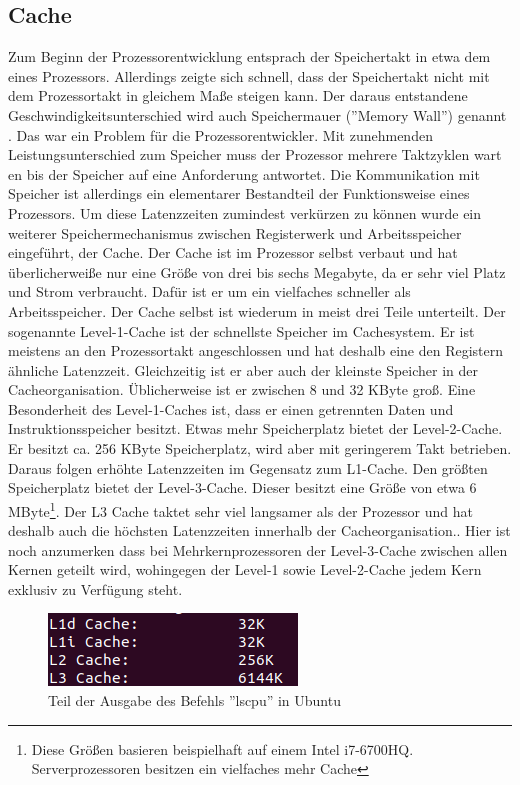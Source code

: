 \documentclass[12pt]{article}
\begin{document}
\subsection{Cache}
Zum Beginn der Prozessorentwicklung entsprach der Speichertakt in etwa dem eines Prozessors. Allerdings zeigte sich schnell, dass der Speichertakt nicht mit dem Prozessortakt in gleichem Maße steigen kann. Der daraus entstandene Geschwindigkeitsunterschied wird auch Speichermauer (''Memory Wall'') genannt \cite{mckee2004reflections}.
Das war ein Problem für die Prozessorentwickler. Mit zunehmenden Leistungsunterschied zum Speicher muss der Prozessor mehrere Taktzyklen wart%
en bis der Speicher auf eine Anforderung antwortet. Die Kommunikation mit Speicher ist allerdings ein elementarer Bestandteil der Funktionsweise eines Prozessors. Um diese Latenzzeiten zumindest verkürzen zu können wurde ein weiterer Speichermechanismus zwischen Registerwerk und Arbeitsspeicher eingeführt, der Cache. Der Cache ist im Prozessor selbst verbaut und hat überlicherweiße nur eine Größe von drei bis sechs Megabyte, da er sehr viel Platz und Strom verbraucht. Dafür ist er um ein vielfaches schneller als Arbeitsspeicher. Der Cache selbst ist wiederum in meist drei Teile unterteilt. Der sogenannte Level-1-Cache ist der schnellste Speicher im Cachesystem. Er ist meistens an den Prozessortakt angeschlossen und hat deshalb eine den Registern ähnliche Latenzzeit. Gleichzeitig ist er aber auch der kleinste Speicher in der Cacheorganisation. 
Üblicherweise ist er zwischen 8 und 32 KByte groß. Eine Besonderheit des Level-1-Caches ist, dass er  einen getrennten Daten und Instruktionsspeicher besitzt. Etwas mehr Speicherplatz bietet der Level-2-Cache. Er besitzt ca. 256 KByte Speicherplatz, wird aber mit geringerem Takt betrieben. Daraus folgen erhöhte Latenzzeiten im Gegensatz zum L1-Cache. Den größten Speicherplatz bietet der Level-3-Cache. Dieser besitzt eine Größe von etwa 6 MByte\footnote{Diese Größen basieren beispielhaft auf einem Intel i7-6700HQ. Serverprozessoren besitzen ein vielfaches mehr Cache}. Der L3 Cache taktet sehr viel langsamer als der Prozessor und hat deshalb auch die höchsten Latenzzeiten innerhalb der Cacheorganisation.\cite{molka2009memory}. Hier ist noch anzumerken dass bei Mehrkernprozessoren der Level-3-Cache zwischen allen Kernen geteilt wird, wohingegen der Level-1 sowie Level-2-Cache jedem Kern exklusiv zu Verfügung steht.


\begin{figure}[!htb]
\centering
\includegraphics[scale=0.5]{lscpu}
\caption{Teil der Ausgabe des Befehls ''lscpu'' in Ubuntu}
\centering
\label{fig:lscpu}
\end{figure}
\end{document}
